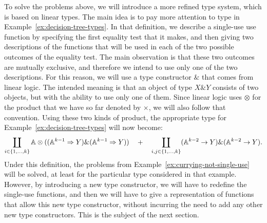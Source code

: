 To solve the problems above, we will introduce a more refined type system, which is based on linear types.  The main idea is to pay more attention to type  in Example~\ref{ex:decision-tree-types}. In that definition, we describe a single-use use function by specifying the first equality test that it makes, and then giving two descriptions of the functions that will be used in each of the two possible outcomes of the equality test. The main observation is that these two outcomes are mutually exclusive, and therefore we intend to use only one of the two descriptions. For this reason, we will use a  type constructor $\&$ that comes from linear logic. The intended meaning is  that an object of type $X \& Y$ consists of two objects, but with the ability to use only one of them. Since linear logic uses $\otimes$  for the  product that we have so far denoted by $\times$, we will also follow that convention. Using these two kinds of product, the appropriate type for Example~\ref{ex:decision-tree-types} will now become: 
\begin{align*}
\coprod_{i \in \{1,\ldots,k\}} 
        \mathbb A \otimes ((\mathbb A^{k-1} \Rightarrow Y) \& (\mathbb A^{k-1} \Rightarrow Y))
          \quad + \quad 
    \coprod_{i, j \in \{1,\ldots,k\}} (\mathbb A^{k-2} \to Y) \& (\mathbb A^{k-2} \to Y).
    \end{align*}
Under this definition, the problems from Example~\ref{ex:currying-not-single-use} will be solved, at least for the particular type considered in that example. However, by introducing a new type constructor, we will have to redefine the single-use functions, and then we will have to give a representation of functions that allow this new type constructor, without incurring the need to add any other new type constructors. This is the subject of the next section.

